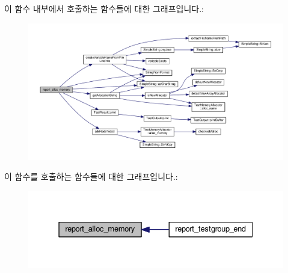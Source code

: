 이 함수 내부에서 호출하는 함수들에 대한 그래프입니다.\+:
\nopagebreak
\begin{figure}[H]
\begin{center}
\leavevmode
\includegraphics[width=350pt]{class_code_memory_report_formatter_a662fcaf995e9e0137c8debfc33530366_cgraph}
\end{center}
\end{figure}




이 함수를 호출하는 함수들에 대한 그래프입니다.\+:
\nopagebreak
\begin{figure}[H]
\begin{center}
\leavevmode
\includegraphics[width=331pt]{class_code_memory_report_formatter_a662fcaf995e9e0137c8debfc33530366_icgraph}
\end{center}
\end{figure}


